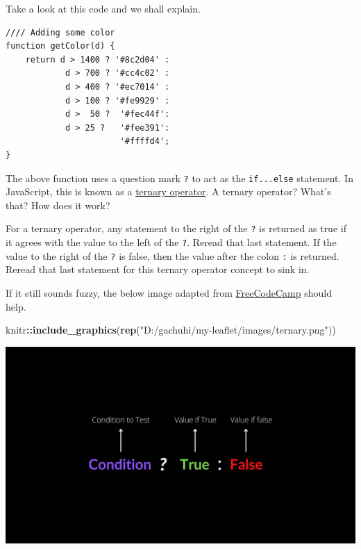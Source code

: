 \documentclass[
]{book}
\newenvironment{Shaded}{\begin{snugshade}}{\end{snugshade}}
\newcommand{\FunctionTok}[1]{\textcolor[rgb]{0.13,0.29,0.53}{\textbf{#1}}}
\newcommand{\NormalTok}[1]{#1}
\newcommand{\SpecialCharTok}[1]{\textcolor[rgb]{0.81,0.36,0.00}{\textbf{#1}}}
\newcommand{\StringTok}[1]{\textcolor[rgb]{0.31,0.60,0.02}{#1}}
\begin{document}
Take a look at this code and we shall explain.

\begin{verbatim}
//// Adding some color
function getColor(d) {
    return d > 1400 ? '#8c2d04' :
            d > 700 ? '#cc4c02' :
            d > 400 ? '#ec7014' :
            d > 100 ? '#fe9929' :
            d >  50 ?  '#fec44f':
            d > 25 ?   '#fee391':
                       '#ffffd4';
}
\end{verbatim}

The above function uses a question mark \texttt{?} to act as the \texttt{if...else} statement. In JavaScript, this is known as a \href{https://www.freecodecamp.org/news/how-the-question-mark-works-in-javascript/}{ternary operator}. A ternary operator? What's that? How does it work?

For a ternary operator, any statement to the right of the \texttt{?} is returned as true if it agrees with the value to the left of the \texttt{?}. Reread that last statement. If the value to the right of the \texttt{?} is false, then the value after the colon \texttt{:} is returned. Reread that last statement for this ternary operator concept to sink in.

If it still sounds fuzzy, the below image adapted from \href{https://www.freecodecamp.org/news/how-the-question-mark-works-in-javascript/}{FreeCodeCamp} should help.

\begin{Shaded}
\begin{Highlighting}[]
\NormalTok{knitr}\SpecialCharTok{::}\FunctionTok{include\_graphics}\NormalTok{(}\FunctionTok{rep}\NormalTok{(}\StringTok{"D:/gachuhi/my{-}leaflet/images/ternary.png"}\NormalTok{))}
\end{Highlighting}
\end{Shaded}

\includegraphics[width=22.22in]{../images/ternary}
\end{document}
